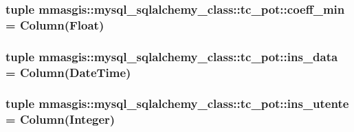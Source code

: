 \hypertarget{classmmasgis_1_1mysql__sqlalchemy__class_1_1tc__pot_a34a74ac95554c977e361dd5bb85836b5}{
\subsubsection[{coeff\_\-min}]{\setlength{\rightskip}{0pt plus 5cm}tuple {\bf mmasgis::mysql\_\-sqlalchemy\_\-class::tc\_\-pot::coeff\_\-min} = Column(Float)}}
\label{classmmasgis_1_1mysql__sqlalchemy__class_1_1tc__pot_a34a74ac95554c977e361dd5bb85836b5}
\hypertarget{classmmasgis_1_1mysql__sqlalchemy__class_1_1tc__pot_a95bd4a5a624f18ef2ec8d089d1599103}{
\subsubsection[{ins\_\-data}]{\setlength{\rightskip}{0pt plus 5cm}tuple {\bf mmasgis::mysql\_\-sqlalchemy\_\-class::tc\_\-pot::ins\_\-data} = Column(DateTime)}}
\label{classmmasgis_1_1mysql__sqlalchemy__class_1_1tc__pot_a95bd4a5a624f18ef2ec8d089d1599103}
\hypertarget{classmmasgis_1_1mysql__sqlalchemy__class_1_1tc__pot_a166b4667d8b70fa174f485830715aa4d}{
\subsubsection[{ins\_\-utente}]{\setlength{\rightskip}{0pt plus 5cm}tuple {\bf mmasgis::mysql\_\-sqlalchemy\_\-class::tc\_\-pot::ins\_\-utente} = Column(Integer)}}
\label{classmmasgis_1_1mysql__sqlalchemy__class_1_1tc__pot_a166b4667d8b70fa174f485830715aa4d}
